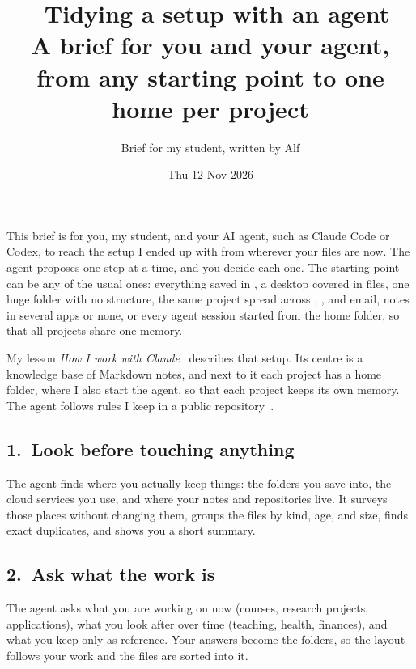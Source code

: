 \documentclass[11pt,a4paper]{article}
\title{\emo{file folder}\ Tidying a setup with an agent\\[0.3em]
  \large A brief for you and your agent, from any starting point to one home per project}
\author{Brief for my student, written by Alf}
\date{Thu 12 Nov 2026}
\begin{document}
\maketitle
\vspace{-1.5em}

This brief is for you, my student, and your AI agent, such as Claude Code or Codex, to reach the setup I ended up with from wherever your files are now. The agent proposes one step at a time, and you decide each one. The starting point can be any of the usual ones: everything saved in , a desktop covered in files, one huge folder with no structure, the same project spread across , , and email, notes in several apps or none, or every agent session started from the home folder, so that all projects share one memory.

My lesson \emph{How I work with Claude}~\cite{wwc} describes that setup. Its centre is a knowledge base of Markdown notes, and next to it each project has a home folder, where I also start the agent, so that each project keeps its own memory. The agent follows rules I keep in a public repository~\cite{dots}.

\subsection*{1.\ Look before touching anything}

The agent finds where you actually keep things: the folders you save into, the cloud services you use, and where your notes and repositories live. It surveys those places without changing them, groups the files by kind, age, and size, finds exact duplicates, and shows you a short summary.

\subsection*{2.\ Ask what the work is}

The agent asks what you are working on now (courses, research projects, applications), what you look after over time (teaching, health, finances), and what you keep only as reference. Your answers become the folders, so the layout follows your work and the files are sorted into it.
\end{document}
